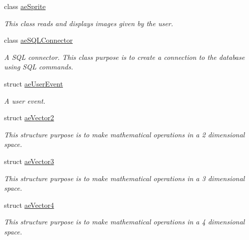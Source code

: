 \begin{DoxyCompactItemize}
class \hyperlink{classae_core_1_1ae_sprite}{ae\+Sprite}
\begin{DoxyCompactList}\small\item\em This class reads and displays images given by the user. \end{DoxyCompactList}\item 
class \hyperlink{classae_core_1_1ae_s_q_l_connector}{ae\+S\+Q\+L\+Connector}
\begin{DoxyCompactList}\small\item\em A S\+QL connector. This class purpose is to create a connection to the database using S\+QL commands. \end{DoxyCompactList}\item 
struct \hyperlink{structae_core_1_1ae_user_event}{ae\+User\+Event}
\begin{DoxyCompactList}\small\item\em A user event. \end{DoxyCompactList}\item 
struct \hyperlink{structae_core_1_1ae_vector2}{ae\+Vector2}
\begin{DoxyCompactList}\small\item\em This structure purpose is to make mathematical operations in a 2 dimensional space. \end{DoxyCompactList}\item 
struct \hyperlink{structae_core_1_1ae_vector3}{ae\+Vector3}
\begin{DoxyCompactList}\small\item\em This structure purpose is to make mathematical operations in a 3 dimensional space. \end{DoxyCompactList}\item 
struct \hyperlink{structae_core_1_1ae_vector4}{ae\+Vector4}
\begin{DoxyCompactList}\small\item\em This structure purpose is to make mathematical operations in a 4 dimensional space. \end{DoxyCompactList}\end{DoxyCompactItemize}
